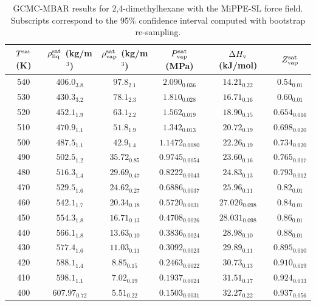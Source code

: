 \documentclass[journal=jctc,manuscript=article]{achemso}
\begin{document}
\begin{table}[htb!]
	\caption{GCMC-MBAR results for 2,4-dimethylhexane with the MiPPE-SL force field. Subscripts correspond to the 95\% confidence interval computed with bootstrap re-sampling.}
	\begin{center}
		\begin{tabular}{|c|c|c|c|c|c|}
			\hline
			$T^{\rm sat}$ (K) & $\rho_{\rm liq}^{\rm sat}$ (kg/m$^3$) & $\rho_{\rm vap}^{\rm sat}$ (kg/m$^3$) & $P_{\rm vap}^{\rm sat}$ (MPa) & $\Delta H_{\rm v}$ (kJ/mol) & $Z_{\rm vap}^{\rm sat}$ \\ \hline
			540 & $406.0_{3.8}$ & $97.8_{2.1}$ & $2.090_{0.036}$ & $14.21_{0.22}$ & $0.54_{0.01}$ \\
			530 & $430.3_{3.2}$ & $78.1_{2.3}$ & $1.810_{0.028}$ & $16.71_{0.16}$ & $0.60_{0.01}$ \\
			520 & $452.1_{1.9}$ & $63.1_{2.2}$ & $1.562_{0.019}$ & $18.90_{0.15}$ & $0.654_{0.016}$ \\
			510 & $470.9_{1.1}$ & $51.8_{1.9}$ & $1.342_{0.013}$ & $20.72_{0.19}$ & $0.698_{0.020}$ \\
			500 & $487.5_{1.1}$ & $42.9_{1.4}$ & $1.1472_{0.0080}$ & $22.26_{0.19}$ & $0.734_{0.020}$ \\
			490 & $502.5_{1.2}$ & $35.72_{0.85}$ & $0.9745_{0.0054}$ & $23.60_{0.16}$ & $0.765_{0.017}$ \\
			480 & $516.3_{1.4}$ & $29.69_{0.47}$ & $0.8222_{0.0043}$ & $24.83_{0.13}$ & $0.793_{0.012}$ \\
			470 & $529.5_{1.6}$ & $24.62_{0.27}$ & $0.6886_{0.0037}$ & $25.96_{0.11}$ & $0.82_{0.01}$ \\
			460 & $542.1_{1.7}$ & $20.34_{0.18}$ & $0.5720_{0.0031}$ & $27.026_{0.098}$ & $0.84_{0.01}$ \\
			450 & $554.3_{1.8}$ & $16.71_{0.13}$ & $0.4708_{0.0026}$ & $28.031_{0.098}$ & $0.86_{0.01}$ \\
			440 & $566.1_{1.8}$ & $13.63_{0.10}$ & $0.3836_{0.0024}$ & $28.98_{0.10}$ & $0.88_{0.01}$ \\
			430 & $577.4_{1.6}$ & $11.03_{0.11}$ & $0.3092_{0.0023}$ & $29.89_{0.11}$ & $0.895_{0.010}$ \\
			420 & $588.1_{1.4}$ & $8.85_{0.15}$ & $0.2463_{0.0022}$ & $30.73_{0.13}$ & $0.910_{0.019}$ \\
			410 & $598.1_{1.1}$ & $7.02_{0.19}$ & $0.1937_{0.0024}$ & $31.51_{0.17}$ & $0.924_{0.033}$ \\
			400 & $607.97_{0.72}$ & $5.51_{0.22}$ & $0.1503_{0.0031}$ & $32.27_{0.22}$ & $0.937_{0.056}$ \\

\end{tabular}
\end{center}
\end{table}
\end{document}
